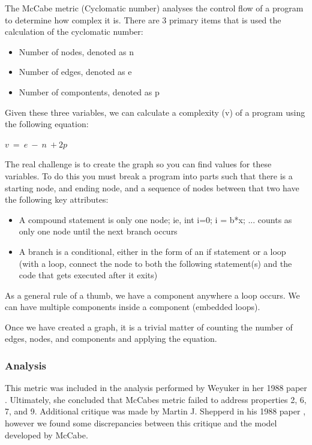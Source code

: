 \documentclass[]{article}
\begin{document}
The McCabe metric (Cyclomatic number) analyses the control flow of a program to determine how complex it is. 
There are 3 primary items that is used the calculation of the cyclomatic number:
\begin{itemize}
	\item Number of nodes, denoted as n
	\item Number of edges, denoted as e
	\item Number of compontents, denoted as p
\end{itemize}

Given these three variables, we can calculate a complexity (v) of a program using the following equation:

$v ~= ~e ~- ~n ~+ 2p$

The real challenge is to create the graph so you can find values for these variables.
To do this you must break a program into parts such that there is a starting node, and ending node, and a sequence of nodes between that two have the following key attributes:
\begin{itemize}
	\item A compound statement is only one node; ie, int i=0; i = b*x; ... counts as only one node until the next branch occurs
	\item A branch is a conditional, either in the form of an if statement or a loop (with a loop, connect the node to both the following statement(s) and the code that gets executed after it exits)
\end{itemize}

As a general rule of a thumb, we have a component anywhere a loop occurs.
We can have multiple components inside a component (embedded loops). 

Once we have created a graph, it is a trivial matter of counting the number of edges, nodes, and components and applying the equation.

\subsubsection{Analysis}

This metric was included in the analysis performed by Weyuker in her 1988 paper \cite{ref:evaluating_software_complexity_measures}.
Ultimately, she concluded that McCabes metric failed to address properties 2, 6, 7, and 9.
Additional critique was made by Martin J. Shepperd in his 1988 paper \cite{shepperd1988critique}, however we found some discrepancies between this critique and the model developed by McCabe.
\end{document}

